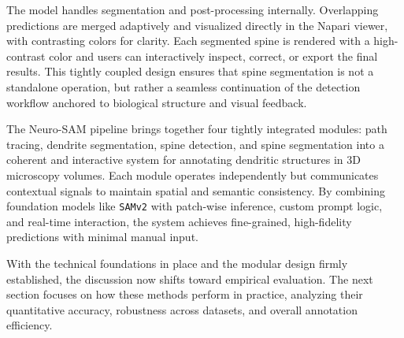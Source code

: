 The model handles segmentation and post-processing internally. Overlapping predictions are merged adaptively and visualized directly in the Napari viewer, with contrasting colors for clarity. Each segmented spine is rendered with a high-contrast color and users can interactively inspect, correct, or export the final results. This tightly coupled design ensures that spine segmentation is not a standalone operation, but rather a seamless continuation of the detection workflow anchored to biological structure and visual feedback.

The Neuro-\gls{SAM} pipeline brings together four tightly integrated modules: path tracing, dendrite segmentation, spine detection, and spine segmentation into a coherent and interactive system for annotating dendritic structures in 3D microscopy volumes. Each module operates independently but communicates contextual signals to maintain spatial and semantic consistency. By combining foundation models like \texttt{\gls{SAMv2}} with patch-wise inference, custom prompt logic, and real-time interaction, the system achieves fine-grained, high-fidelity predictions with minimal manual input.

With the technical foundations in place and the modular design firmly established, the discussion now shifts toward empirical evaluation. The next section focuses on how these methods perform in practice, analyzing their quantitative accuracy, robustness across datasets, and overall annotation efficiency.

